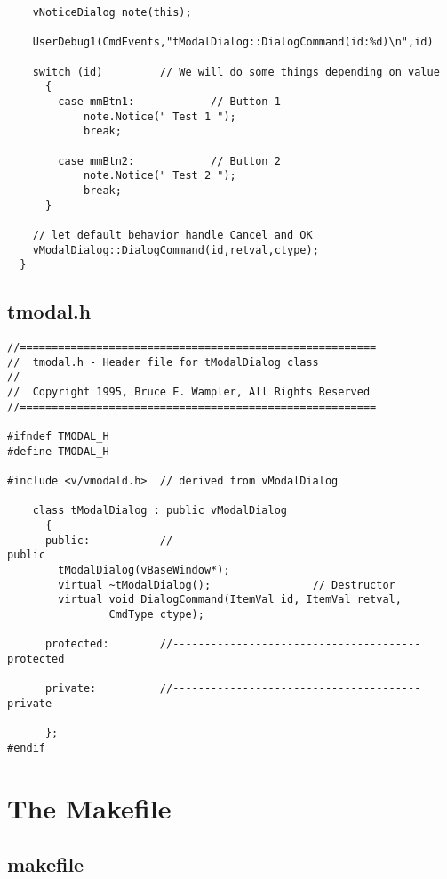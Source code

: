 \begin{verbatim}
    vNoticeDialog note(this);

    UserDebug1(CmdEvents,"tModalDialog::DialogCommand(id:%d)\n",id)

    switch (id)         // We will do some things depending on value
      {
        case mmBtn1:            // Button 1
            note.Notice(" Test 1 ");
            break;

        case mmBtn2:            // Button 2
            note.Notice(" Test 2 ");
            break;
      }

    // let default behavior handle Cancel and OK
    vModalDialog::DialogCommand(id,retval,ctype);
  }
\end{verbatim}
\normalfont\normalsize

%
\subsection*{tmodal.h}
\footnotesize
\begin{verbatim}
//========================================================
//  tmodal.h - Header file for tModalDialog class
//
//  Copyright 1995, Bruce E. Wampler, All Rights Reserved
//========================================================

#ifndef TMODAL_H
#define TMODAL_H

#include <v/vmodald.h>  // derived from vModalDialog

    class tModalDialog : public vModalDialog
      {
      public:           //---------------------------------------- public
        tModalDialog(vBaseWindow*);
        virtual ~tModalDialog();                // Destructor
        virtual void DialogCommand(ItemVal id, ItemVal retval,
                CmdType ctype);

      protected:        //--------------------------------------- protected

      private:          //--------------------------------------- private

      };
#endif
\end{verbatim}
\normalfont\normalsize

\section{The Makefile}

\subsection*{makefile}

